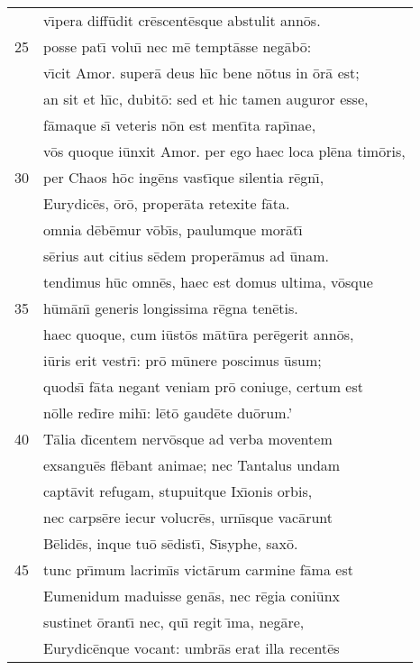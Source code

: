 \documentclass[paper=6in:9in,pagesize=pdftex,
               headinclude=on,footinclude=on,12pt]{scrbook}
\begin{document}
\begin{longtable}[p]{ r l }
 & v\={\i}pera diff\=udit cr\=escent\=esque abstulit ann\=os.\\ 
25 & posse pat\={\i} volu\={\i} nec m\=e tempt\=asse neg\=ab\=o:\\ 
 & v\={\i}cit Amor. super\=a deus h\={\i}c bene n\=otus in \=or\=a est;\\ 
 & an sit et h\={\i}c, dubit\=o: sed et hic tamen auguror esse,\\ 
 & f\=amaque s\={\i} veteris n\=on est ment\={\i}ta rap\={\i}nae,\\ 
 & v\=os quoque i\=unxit Amor. per ego haec loca pl\=ena tim\=oris,\\ 
30 & per Chaos h\=oc ing\=ens vast\={\i}que silentia r\=egn\={\i},\\ 
 & Eurydic\=es, \=or\=o, proper\=ata retexite f\=ata.\\ 
 & omnia d\=eb\=emur v\=ob\={\i}s, paulumque mor\=at\={\i}\\ 
 & s\=erius aut citius s\=edem proper\=amus ad \=unam.\\ 
 & tendimus h\=uc omn\=es, haec est domus ultima, v\=osque\\ 
35 & h\=um\=an\={\i} generis longissima r\=egna ten\=etis.\\ 
 & haec quoque, cum i\=ust\=os m\=at\=ura per\=egerit ann\=os,\\ 
 & i\=uris erit vestr\={\i}: pr\=o m\=unere poscimus \=usum;\\ 
 & quods\={\i} f\=ata negant veniam pr\=o coniuge, certum est\\ 
 & n\=olle red\={\i}re mih\={\i}: l\=et\=o gaud\=ete du\=orum.'\\ 
40 & \indent T\=alia d\={\i}centem nerv\=osque ad verba moventem\\ 
 & exsangu\=es fl\=ebant animae; nec Tantalus undam\\ 
 & capt\=avit refugam, stupuitque Ix\={\i}onis orbis,\\ 
 & nec carps\=ere iecur volucr\=es, urn\={\i}sque vac\=arunt\\ 
 & B\=elid\=es, inque tu\=o s\=edist\={\i}, S\={\i}syphe, sax\=o.\\ 
45 & tunc pr\={\i}mum lacrim\={\i}s vict\=arum carmine f\=ama est\\ 
 & Eumenidum maduisse gen\=as, nec r\=egia coni\=unx\\ 
 & sustinet \=orant\={\i} nec, qu\={\i} regit \={\i}ma, neg\=are,\\ 
 & Eurydic\=enque vocant: umbr\=as erat illa recent\=es\\ 

\end{longtable}
\end{document}
